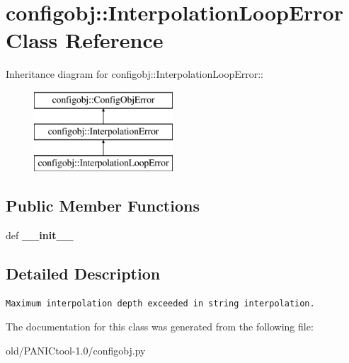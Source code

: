 \section{configobj::Interpolation\-Loop\-Error Class Reference}
\label{classconfigobj_1_1InterpolationLoopError}
Inheritance diagram for configobj::Interpolation\-Loop\-Error::\begin{figure}[H]
\begin{center}
\leavevmode
\includegraphics[height=3cm]{classconfigobj_1_1InterpolationLoopError}
\end{center}
\end{figure}
\subsection*{Public Member Functions}
\begin{CompactItemize}
\item 
def \textbf{\_\-\_\-init\_\-\_\-}\label{classconfigobj_1_1InterpolationLoopError_8aad5c776e85e759edae4823a3d5491f}

\end{CompactItemize}


\subsection{Detailed Description}


\footnotesize\begin{verbatim}Maximum interpolation depth exceeded in string interpolation.\end{verbatim}
\normalsize
 



The documentation for this class was generated from the following file:\begin{CompactItemize}
\item 
old/PANICtool-1.0/configobj.py\end{CompactItemize}
